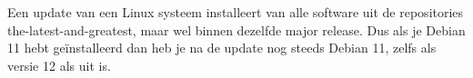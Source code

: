 Een update van een Linux systeem installeert van alle software uit de repositories the-latest-and-greatest, maar wel binnen dezelfde major release. Dus als je Debian 11 hebt ge\"installeerd dan heb je na de update nog steeds Debian 11, zelfs als versie 12 als uit is.

